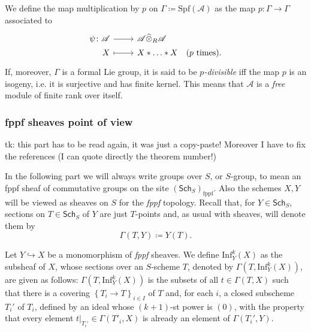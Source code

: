 \documentclass[../Main]{subfiles}
\begin{document}
\begin{defn}\label{defn:pDivisibleFormalLieGroup}
	We define the map multiplication by $p$ on $\Gamma \coloneqq \mathrm{Spf}(\mathscr{A})$
	as the map $p\colon \Gamma \to \Gamma$
	associated to 
	\begin{equation*}
	\begin{tikzcd}[row sep = 0ex
		,/tikz/column 1/.append style={anchor=base east}
		,/tikz/column 2/.append style={anchor=base west}]
		\psi\colon \mathscr{A} \arrow[r, "", rightarrow] &
		\mathscr{A} \widehat{\otimes}_R \mathscr{A} \\
		X \arrow[r, "", mapsto] & 
		X \ast \ldots \ast X
	\quad \text{($p$ times)}
	.\end{tikzcd}
	\end{equation*} 
	If, moreover, $\Gamma$ is a formal Lie group, 
	it is said to be {\em $p$-divisible} iff the map $p$ is 
	an isogeny, i.e. it is surjective and has finite kernel.
	This means that $\mathscr{A}$ is a {\em free} module of finite rank over itself.
\end{defn}



\subsubsection{fppf sheaves point of view}
tk: this part has to be read again, it was just a copy-paste!
Moreover I have to fix the references (I can quote directly the theorem number!)

In the following part we will always write groups over $S$, or $S$-group, to mean
an fppf sheaf of commutative groups on the site $(\mathsf{Sch}_{ S })_{\mathrm{fppf}}$.
Also the schemes $X, Y$ will be viewed as sheaves on $S$
for the {\em fppf} topology.
Recall that, for $Y \in \mathsf{Sch}_{ S }$, sections on
$T \in \mathsf{Sch}_{ S }$ of $Y$ are just $T$-points and,
as usual with sheaves, will denote them by
\begin{equation*}
	\Gamma \left( T, Y \right) \coloneqq Y(T)
.\end{equation*}


\begin{defn}\label{defn:kInfNeighbourhood}
	Let $Y \hookrightarrow X$ be a monomorphism of {\em fppf} sheaves.
	We define $\mathrm{Inf}_Y^k(X)$ as the subsheaf of $X$,
	whose sections over an $S$-scheme $T$, denoted by $\Gamma ( T , \mathrm{Inf}_Y^k(X) )$,
	are given as follows:
	$\Gamma ( T , \mathrm{Inf}_Y^k(X) )$ is the subsets of all
	$t \in \Gamma \left( T, X \right)$ such that
	there is a covering $\left\{ T_{ i } \to T \right\}_{ i \in I }$
	of $T$ and, for each $i$, a closed subscheme $T_i'$ of $T_i$,
	defined by an ideal whose $(k+1)$-st power is $(0)$,
	with the property that every element $\left.t\right|_{T_i'} \in \Gamma(T'_i, X)$
	is already an element of $\Gamma(T_i', Y)$.
\end{defn}
\end{document}
